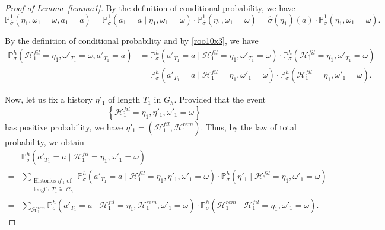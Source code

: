 \documentclass[10pt,a4paper]{amsart}
\renewcommand{\P}{\mathbb{P}}
\begin{document}
\begin{proof}[Proof of Lemma~\ref{lemma1}]
By the definition of conditional probability, we have
\begin{equation}
\P_{\widehat \sigma}^1(\eta_1, \omega_1 = \omega, a_1 = a) = \P_{\widehat \sigma}^1(a_1 = a \mid \eta_1, \omega_1 = \omega) \cdot \P_{\widehat \sigma}^1(\eta_1, \omega_1 = \omega) = \widehat \sigma(\eta_1)(a) \cdot \P_{\widehat \sigma}^1(\eta_1, \omega_1 = \omega).
\label{tralala2}
\end{equation}

By the definition of conditional probability and by \eqref{roo10x3}, we have
\begin{equation}
\begin{aligned}
\P_{\sigma}^h(\mathcal H^{fil}_1 = \eta_1, \omega'_{T_1} = \omega, a'_{T_1} = a) 
&= \P_{\sigma}^h(a'_{T_1} = a \mid \mathcal H^{fil}_1 = \eta_1, \omega'_{T_1} = \omega) \cdot \P_{\sigma}^h(\mathcal H^{fil}_1 = \eta_1, \omega'_{T_1} = \omega) \\
&= \P_{\sigma}^h(a'_{T_1} = a \mid \mathcal H^{fil}_1 = \eta_1, \omega'_{1} = \omega) \cdot \P_{\sigma}^h(\mathcal H^{fil}_1 = \eta_1, \omega'_{1} = \omega).
\end{aligned}
\label{tralala3}
\end{equation}

Now, let us fix a history $\eta'_{1}$ of length $T_1$ in $G_h$. Provided that the event 
$$\left\{\mathcal H^{fil}_1 = \eta_1, \eta'_{1}, \omega'_{1} = \omega\right\}$$
has positive probability, we have $\eta'_{1} = \left(\mathcal H^{fil}_1, \mathcal H^{rem}_1\right)$. Thus, by the law of total probability, we obtain
\begin{equation}
\begin{aligned}
&\P_{\sigma}^h (a'_{T_1} = a \mid \mathcal H^{fil}_1 = \eta_1, \omega'_{1} = \omega) 
\\
=&
\sum_{\substack{\text{Histories } \eta'_{1} \text{ of} \\ \text{length } T_{1} \text{ in } G_h}}
\P_{\sigma}^h (a'_{T_1} = a \mid \mathcal H^{fil}_1 = \eta_1, \eta'_{1}, \omega'_{1} = \omega) \cdot 
\P_{\sigma}^h (\eta'_{1} \mid \mathcal H^{fil}_1 = \eta_1, \omega'_{1} = \omega) \\
=&
\sum_{\mathcal H^{rem}_1}
\P_{\sigma}^h (a'_{T_1} = a \mid \mathcal H^{fil}_1 = \eta_1, \mathcal H^{rem}_1, \omega'_{1} = \omega) \cdot 
\P_{\sigma}^h (\mathcal H^{rem}_1 \mid \mathcal H^{fil}_1 = \eta_1, \omega'_{1} = \omega).
\end{aligned}
\label{tralala4}
\end{equation}


\end{proof}
\end{document}

